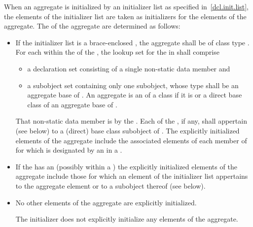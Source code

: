 \pnum
When an aggregate is initialized by an initializer list
as specified in~\ref{dcl.init.list},
the elements of the initializer list are taken as initializers
for the elements of the aggregate.
The 
of the aggregate are determined as follows:
\begin{itemize}
\item
If the initializer list is
a brace-enclosed ,
the aggregate shall be of class type .
For each 
within the 
of the ,
the lookup set for the 
in  shall comprise
\begin{itemize}
\item
a declaration set consisting of a single non-static data member and
\item
a subobject set containing only one subobject,
whose type shall be an aggregate base of .
An aggregate  is an  of a class 
if it is  or a direct base class of an aggregate base of .
\end{itemize}

That non-static data member is 
by the .
Each  of the ,
if any,
shall appertain (see below) to a (direct) base class subobject of .
The explicitly initialized elements of the aggregate include
the associated elements of each member  of 
for which  is designated by an 
in a .

\item
If the  has an 
(possibly within a )
the explicitly initialized elements of the aggregate
include those for which an element of the initializer list
appertains to the aggregate element or to a subobject thereof (see below).
\item
No other elements of the aggregate are explicitly initialized.
\begin{note}
The initializer \tcode{\{\}} does not explicitly initialize
any elements of the aggregate.
\end{note}
\end{itemize}
